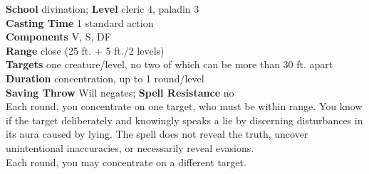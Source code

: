 \textbf{School} divination; \textbf{Level} cleric 4, paladin 3\\
\textbf{Casting Time} 1 standard action\\
\textbf{Components} V, S, DF\\
\textbf{Range} close (25 ft. + 5 ft./2 levels)\\
\textbf{Targets} one creature/level, no two of which can be more than 30 ft. apart\\
\textbf{Duration} concentration, up to 1 round/level\\
\textbf{Saving Throw }Will negates; \textbf{Spell Resistance} no\\
Each round, you concentrate on one target, who must be within range. You know if the target deliberately and knowingly speaks a lie by discerning disturbances in its aura caused by lying. The spell does not reveal the truth, uncover unintentional inaccuracies, or necessarily reveal evasions.\\
Each round, you may concentrate on a different target.\\
